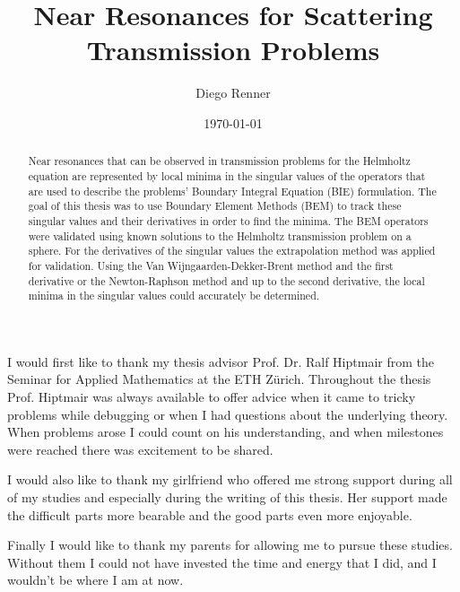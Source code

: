 \documentclass[a4paper, oneside]{discothesis}
\title{Near Resonances for Scattering Transmission Problems}
\author{Diego Renner}
\institute{Seminar for Applied Mathematics \\[2pt]
	Computational Science and Engineering \\[2pt]
ETH Zürich}
\date{\today}
\begin{document}
\frontmatter %
\maketitle
\cleardoublepage

\begin{acknowledgements}
	I would first like to thank my thesis advisor Prof. Dr. Ralf Hiptmair from the Seminar for Applied Mathematics at the ETH Zürich.
	Throughout the thesis Prof. Hiptmair was always available to offer advice when it came to tricky problems while debugging or when I had questions about the underlying theory.
	When problems arose I could count on his understanding, and when milestones were reached there was excitement to be shared.

	I would also like to thank my girlfriend who offered me strong support during all of my studies and especially during the writing of this thesis.
	Her support made the difficult parts more bearable and the good parts even more enjoyable.

	Finally I would like to thank my parents for allowing me to pursue these studies.
	Without them I could not have invested the time and energy that I did, and I wouldn't be where I am at now.
\end{acknowledgements}


\begin{abstract}
	Near resonances that can be observed in transmission problems for the Helmholtz equation are represented by local minima in the singular values of the operators that are used to describe the problems' Boundary Integral Equation (BIE) formulation.
	The goal of this thesis was to use Boundary Element Methods (BEM) to track these singular values and their derivatives in order to find the minima.
	The BEM operators were validated using known solutions to the Helmholtz transmission problem on a sphere.
	For the derivatives of the singular values the extrapolation method was applied for validation.
	Using the Van Wijngaarden-Dekker-Brent method and the first derivative or the Newton-Raphson method and up to the second derivative, the local minima in the singular values could accurately be determined.
\end{abstract}

\tableofcontents

\mainmatter %

\end{document}
